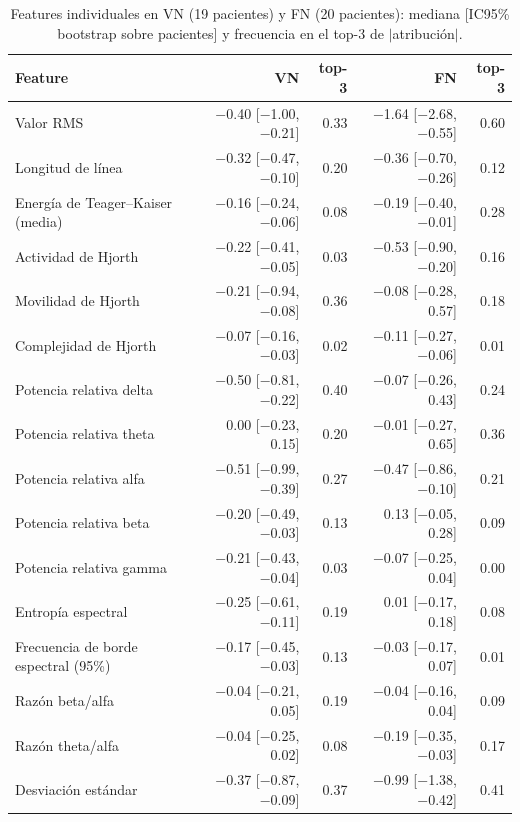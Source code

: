 \begin{table}[htbp]
\centering
\small
\caption{Features individuales en VN (19 pacientes) y FN (20 pacientes): mediana [IC95\% bootstrap sobre pacientes] y frecuencia en el top-3 de $|$atribución$|$.}
\label{tab:feat_ic}
\begin{tabular}{lrrrr}
\toprule
Feature & VN & top-3 & FN & top-3 \\
\midrule
Valor RMS & $-$0.40 [$-$1.00, $-$0.21] & 0.33 & $-$1.64 [$-$2.68, $-$0.55] & 0.60 \\
Longitud de línea & $-$0.32 [$-$0.47, $-$0.10] & 0.20 & $-$0.36 [$-$0.70, $-$0.26] & 0.12 \\
Energía de Teager--Kaiser (media) & $-$0.16 [$-$0.24, $-$0.06] & 0.08 & $-$0.19 [$-$0.40, $-$0.01] & 0.28 \\
Actividad de Hjorth & $-$0.22 [$-$0.41, $-$0.05] & 0.03 & $-$0.53 [$-$0.90, $-$0.20] & 0.16 \\
Movilidad de Hjorth & $-$0.21 [$-$0.94, $-$0.08] & 0.36 & $-$0.08 [$-$0.28, 0.57] & 0.18 \\
Complejidad de Hjorth & $-$0.07 [$-$0.16, $-$0.03] & 0.02 & $-$0.11 [$-$0.27, $-$0.06] & 0.01 \\
Potencia relativa delta & $-$0.50 [$-$0.81, $-$0.22] & 0.40 & $-$0.07 [$-$0.26, 0.43] & 0.24 \\
Potencia relativa theta & 0.00 [$-$0.23, 0.15] & 0.20 & $-$0.01 [$-$0.27, 0.65] & 0.36 \\
Potencia relativa alfa & $-$0.51 [$-$0.99, $-$0.39] & 0.27 & $-$0.47 [$-$0.86, $-$0.10] & 0.21 \\
Potencia relativa beta & $-$0.20 [$-$0.49, $-$0.03] & 0.13 & 0.13 [$-$0.05, 0.28] & 0.09 \\
Potencia relativa gamma & $-$0.21 [$-$0.43, $-$0.04] & 0.03 & $-$0.07 [$-$0.25, 0.04] & 0.00 \\
Entropía espectral & $-$0.25 [$-$0.61, $-$0.11] & 0.19 & 0.01 [$-$0.17, 0.18] & 0.08 \\
Frecuencia de borde espectral (95\%) & $-$0.17 [$-$0.45, $-$0.03] & 0.13 & $-$0.03 [$-$0.17, 0.07] & 0.01 \\
Razón beta/alfa & $-$0.04 [$-$0.21, 0.05] & 0.19 & $-$0.04 [$-$0.16, 0.04] & 0.09 \\
Razón theta/alfa & $-$0.04 [$-$0.25, 0.02] & 0.08 & $-$0.19 [$-$0.35, $-$0.03] & 0.17 \\
Desviación estándar & $-$0.37 [$-$0.87, $-$0.09] & 0.37 & $-$0.99 [$-$1.38, $-$0.42] & 0.41 \\
\bottomrule
\end{tabular}
\end{table}


